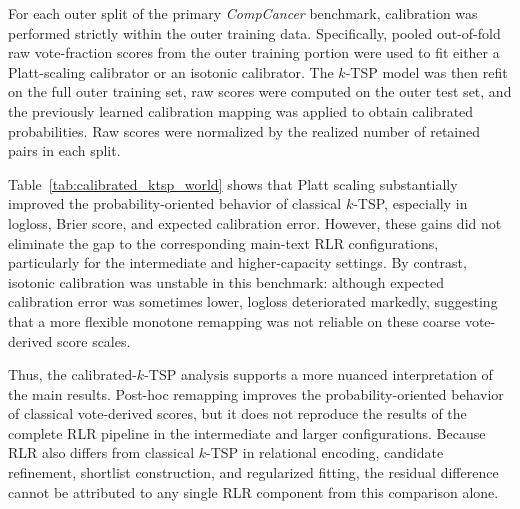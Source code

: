 \documentclass[11pt, a4paper]{article}
\begin{document}
For each outer split of the primary \emph{CompCancer} benchmark, calibration was performed strictly within the outer training data. Specifically, pooled out-of-fold raw vote-fraction scores from the outer training portion were used to fit either a Platt-scaling calibrator or an isotonic calibrator. The $k$-TSP model was then refit on the full outer training set, raw scores were computed on the outer test set, and the previously learned calibration mapping was applied to obtain calibrated probabilities. Raw scores were normalized by the realized number of retained pairs in each split.

Table~\ref{tab:calibrated_ktsp_world} shows that Platt scaling substantially improved the probability-oriented behavior of classical $k$-TSP, especially in logloss, Brier score, and expected calibration error. However, these gains did not eliminate the gap to the corresponding main-text RLR configurations, particularly for the intermediate and higher-capacity settings. By contrast, isotonic calibration was unstable in this benchmark: although expected calibration error was sometimes lower, logloss deteriorated markedly, suggesting that a more flexible monotone remapping was not reliable on these coarse vote-derived score scales.

Thus, the calibrated-$k$-TSP analysis supports a more nuanced interpretation of the main results. Post-hoc remapping improves the probability-oriented behavior of classical vote-derived scores, but it does not reproduce the results of the complete RLR pipeline in the intermediate and larger configurations. Because RLR also differs from classical $k$-TSP in relational encoding, candidate refinement, shortlist construction, and regularized fitting, the residual difference cannot be attributed to any single RLR component from this comparison alone.
\end{document}
